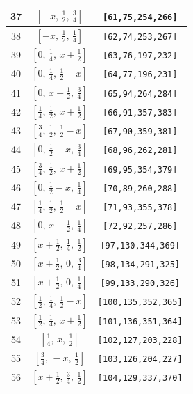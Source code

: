 \documentclass[fleqn,8pt]{jsarticle}
\begin{document}
\begin{longtable}{ccc}
37 & $\left[ - x,\, \frac{1}{2},\, \frac{3}{4} \right]$ & {\tt [61,75,254,266]} \\ \hline
38 & $\left[ - x,\, \frac{1}{2},\, \frac{1}{4} \right]$ & {\tt [62,74,253,267]} \\ \hline
39 & $\left[ 0,\, \frac{1}{4},\, x + \frac{1}{2} \right]$ & {\tt [63,76,197,232]} \\ \hline
40 & $\left[ 0,\, \frac{1}{4},\, \frac{1}{2} - x \right]$ & {\tt [64,77,196,231]} \\ \hline
41 & $\left[ 0,\, x + \frac{1}{2},\, \frac{3}{4} \right]$ & {\tt [65,94,264,284]} \\ \hline
42 & $\left[ \frac{1}{4},\, \frac{1}{2},\, x + \frac{1}{2} \right]$ & {\tt [66,91,357,383]} \\ \hline
43 & $\left[ \frac{3}{4},\, \frac{1}{2},\, \frac{1}{2} - x \right]$ & {\tt [67,90,359,381]} \\ \hline
44 & $\left[ 0,\, \frac{1}{2} - x,\, \frac{3}{4} \right]$ & {\tt [68,96,262,281]} \\ \hline
45 & $\left[ \frac{3}{4},\, \frac{1}{2},\, x + \frac{1}{2} \right]$ & {\tt [69,95,354,379]} \\ \hline
46 & $\left[ 0,\, \frac{1}{2} - x,\, \frac{1}{4} \right]$ & {\tt [70,89,260,288]} \\ \hline
47 & $\left[ \frac{1}{4},\, \frac{1}{2},\, \frac{1}{2} - x \right]$ & {\tt [71,93,355,378]} \\ \hline
48 & $\left[ 0,\, x + \frac{1}{2},\, \frac{1}{4} \right]$ & {\tt [72,92,257,286]} \\ \hline
49 & $\left[ x + \frac{1}{2},\, \frac{1}{4},\, \frac{1}{2} \right]$ & {\tt [97,130,344,369]} \\ \hline
50 & $\left[ x + \frac{1}{2},\, 0,\, \frac{3}{4} \right]$ & {\tt [98,134,291,325]} \\ \hline
51 & $\left[ x + \frac{1}{2},\, 0,\, \frac{1}{4} \right]$ & {\tt [99,133,290,326]} \\ \hline
52 & $\left[ \frac{1}{2},\, \frac{1}{4},\, \frac{1}{2} - x \right]$ & {\tt [100,135,352,365]} \\ \hline
53 & $\left[ \frac{1}{2},\, \frac{1}{4},\, x + \frac{1}{2} \right]$ & {\tt [101,136,351,364]} \\ \hline
54 & $\left[ \frac{1}{4},\, x,\, \frac{1}{2} \right]$ & {\tt [102,127,203,228]} \\ \hline
55 & $\left[ \frac{3}{4},\, - x,\, \frac{1}{2} \right]$ & {\tt [103,126,204,227]} \\ \hline
56 & $\left[ x + \frac{1}{2},\, \frac{3}{4},\, \frac{1}{2} \right]$ & {\tt [104,129,337,370]} \\ \hline

\end{longtable}
\end{document}
